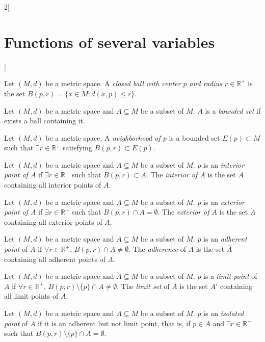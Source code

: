 \documentclass[class=article,10pt,crop=false]{standalone}
\begin{document}
\begin{multicols}{2}[\section{Functions of several variables}]
\begin{definition}
Let $(M,d)$ be a metric space. A \textit{closed ball with center $p$ and radius $r\in\mathbb{R}^+$} is the set $\overline{B}(p,r)=\{x\in M:d(x,p)\leq r\}$.
\end{definition}
\begin{definition}
Let $(M,d)$ be a metric space and $A\subseteq M$ be a subset of $M$. $A$ is a \textit{bounded set} if exists a ball containing it.
\end{definition}
\begin{definition}
Let $(M,d)$ be a metric space. A \textit{neighborhood of $p$} is a bounded set $E(p)\subset M$ such that $\exists r\in\mathbb{R}^+$ satisfying $B(p,r)\subset E(p)$.
\end{definition}
\begin{definition}
Let $(M,d)$ be a metric space and $A\subseteq M$ be a subset of $M$. $p$ is an \textit{interior point of $A$} if $\exists r\in\mathbb{R}^+$ such that $B(p,r)\subset A$. The \textit{interior of $A$} is the set $\mathring A$ containing all interior points of $A$.
\end{definition}
\begin{definition}
Let $(M,d)$ be a metric space and $A\subseteq M$ be a subset of $M$. $p$ is an \textit{exterior point of $A$} if $\exists r\in\mathbb{R}^+$ such that $B(p,r)\cap A=\emptyset$. The \textit{exterior of $A$} is the set $\mathring A$ containing all exterior points of $A$.
\end{definition}
\begin{definition}
Let $(M,d)$ be a metric space and $A\subseteq M$ be a subset of $M$. $p$ is an \textit{adherent point} of $A$ if $\forall r\in\mathbb{R}^+$, $B(p,r)\cap A\ne\emptyset$. The \textit{adherence} of $A$ is the set $\overline{A}$ containing all adherent points of $A$.
\end{definition}
\begin{definition}
Let $(M,d)$ be a metric space and $A\subseteq M$ be a subset of $M$. $p$ is a \textit{limit point} of $A$ if $\forall r\in\mathbb{R}^+$, $B(p,r)\setminus\{p\}\cap A\ne\emptyset$. The \textit{limit set} of $A$ is the set $A'$ containing all limit points of $A$.
\end{definition}
\begin{definition}
Let $(M,d)$ be a metric space and $A\subseteq M$ be a subset of $M$. $p$ is an \textit{isolated point} of $A$ if it is an adherent but not limit point, that is, if $p\in A$ and $\exists r\in\mathbb{R}^+$ such that $B(p,r)\setminus\{p\}\cap A=\emptyset$.
\end{definition}

\end{multicols}
\end{document}
